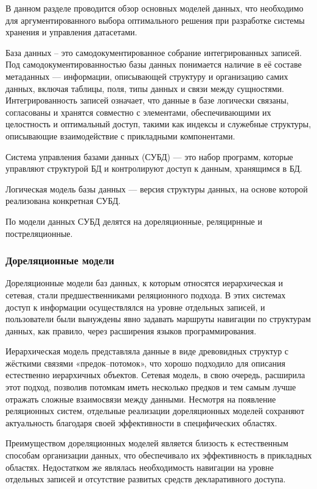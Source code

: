 В данном разделе проводится обзор основных моделей данных,
что необходимо для аргументированного выбора оптимального решения при разработке системы хранения и
управления датасетами.

База данных – это самодокументированное собрание интегрированных записей.
Под самодокументированностью базы данных понимается наличие в её составе метаданных — информации,
описывающей структуру и организацию самих данных, включая таблицы, поля,
типы данных и связи между сущностями.
Интегрированность записей означает, что данные в базе логически связаны, согласованы и хранятся совместно с элементами,
обеспечивающими их целостность и оптимальный доступ, такими как индексы и служебные структуры,
описывающие взаимодействие с прикладными компонентами.~\cite{BD}

Система управления базами данных (СУБД) --- это набор программ, которые управляют
структурой БД и контролируют доступ к данным, хранящимся в БД.

Логическая модель базы данных --- версия структуры данных, на основе которой реализована конкретная СУБД.

По модели данных СУБД делятся на дореляционные, реляцирнные и постреляционные.~\cite{data_model}

\subsubsection*{Дореляционные модели}

Дореляционные модели баз данных, к которым относятся иерархическая и сетевая, стали предшественниками реляционного подхода.
В этих системах доступ к информации осуществлялся на уровне отдельных записей,
и пользователи были вынуждены явно задавать маршруты навигации по структурам данных, как правило,
через расширения языков программирования.~\cite{dorel}

Иерархическая модель представляла данные в виде древовидных структур с жёсткими связями «предок–потомок»,
что хорошо подходило для описания естественно иерархичных объектов.
Сетевая модель, в свою очередь, расширила этот подход, позволив потомкам иметь несколько предков и тем
самым лучше отражать сложные взаимосвязи между данными.
Несмотря на появление реляционных систем, отдельные реализации дореляционных моделей сохраняют актуальность
благодаря своей эффективности в специфических областях.~\cite{dorel}

Преимуществом дореляционных моделей является близость к естественным способам организации данных,
что обеспечивало их эффективность в прикладных областях.
Недостатком же являлась необходимость навигации на уровне отдельных записей и отсутствие развитых средств
декларативного доступа.

